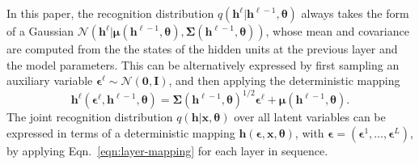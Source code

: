 \documentclass{article} %
\newcommand{\expect}{\mathbb{E}}
\newcommand{\normal}{\mathcal{N}}
\newcommand{\zeroVec}{\mathbf{0}}
\newcommand{\identity}{\mathbf{I}}
\newcommand{\hid}{\mathbf{h}}
\newcommand{\hidLayer}[1]{\hid^{#1}}
\newcommand{\params}{{\boldsymbol{\theta}}}
\newcommand{\obs}{\mathbf{x}}
\newcommand{\numLayers}{L}
\newcommand{\layerIdx}{\ell}
\newcommand{\pmfRec}{q}
\newcommand{\aux}{\boldsymbol{\epsilon}}
\newcommand{\auxLayer}[1]{\aux^{#1}}
\newcommand{\genVar}{\mathbf{y}}
\newcommand{\genPmf}{q}
\newcommand{\genParams}{{\boldsymbol{\theta}}}
\newcommand{\genFunc}{f}
\newcommand{\genAux}{\boldsymbol{\epsilon}}
\newcommand{\normalMean}{\boldsymbol{\mu}}
\newcommand{\normalCov}{\boldsymbol{\Sigma}}
\begin{document}
In this paper, the recognition distribution $\pmfRec(\hidLayer{\layerIdx} | \hidLayer{\layerIdx-1}, \params)$ always takes the form of a Gaussian $\normal(\hidLayer{\layerIdx} | \normalMean(\hidLayer{\layerIdx-1}, \params), \normalCov(\hidLayer{\layerIdx-1}, \params))$, whose mean and covariance are computed from the 
the states of the hidden units at the previous layer and the model parameters. This can be alternatively expressed by first sampling an auxiliary variable $\auxLayer{\layerIdx} \sim \normal(\zeroVec, \identity)$, and then applying the deterministic mapping 
\begin{equation}
\hidLayer{\layerIdx}(\auxLayer{\layerIdx}, \hidLayer{\layerIdx-1}, \params) = \normalCov(\hidLayer{\layerIdx-1}, \params)^{1/2} \auxLayer{\layerIdx} + \normalMean(\hidLayer{\layerIdx-1}, \params). \label{eqn:layer-mapping}
\end{equation}
The joint recognition distribution $\pmfRec(\hid | \obs, \params)$ over all latent variables can be expressed in terms of a deterministic mapping $\hid(\aux, \obs, \params)$, with $\aux = (\auxLayer{1}, \ldots, \auxLayer{\numLayers})$, by applying Eqn.~\ref{eqn:layer-mapping} for each layer in sequence.
\end{document}
